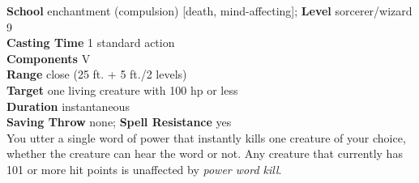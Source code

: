 \textbf{School} enchantment (compulsion) [death, mind-affecting]; \textbf{Level} sorcerer/wizard 9\\
\textbf{Casting Time} 1 standard action\\
\textbf{Components} V\\
\textbf{Range} close (25 ft. + 5 ft./2 levels)\\
\textbf{Target} one living creature with 100 hp or less\\
\textbf{Duration} instantaneous\\
\textbf{Saving Throw} none; \textbf{Spell Resistance} yes\\
You utter a single word of power that instantly kills one creature of your choice, whether the creature can hear the word or not. Any creature that currently has 101 or more hit points is unaffected by \textit{power word kill}.\\
